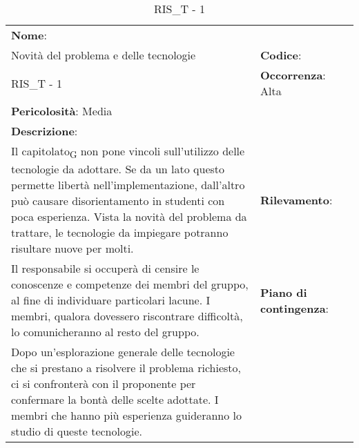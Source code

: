 \renewcommand{\arraystretch}{1.5}
\begin{longtable} { 
		>{\raggedright}p{} 
		>{\raggedright}p{} 
		>{\raggedright}p{}    }
		
		\caption{RIS\_T - 1} \endhead	


	\textbf{Nome}: \\ Novità del problema e delle tecnologie
	& \textbf{Codice}: \\ RIS\_T - 1  
	& \textbf{Occorrenza}: Alta \\ \textbf{Pericolosità}: Media
	
	\tabularnewline
	
	\textbf{Descrizione}: \\ Il \gls{capitolato}\textsubscript{G} non pone vincoli sull'utilizzo delle tecnologie da adottare. Se da un lato questo permette libertà nell'implementazione, dall'altro può causare disorientamento in studenti con poca esperienza. Vista la novità del problema da trattare, le tecnologie da impiegare potranno risultare nuove per molti.
	& 
	\textbf{Rilevamento}: \\ Il responsabile si occuperà di censire le conoscenze e competenze dei membri del gruppo, al fine di individuare particolari lacune. I membri, qualora dovessero riscontrare difficoltà, lo comunicheranno al resto del gruppo. 	
	&  
	\textbf{Piano di contingenza}: \\ Dopo un'esplorazione generale delle tecnologie che si prestano a risolvere il problema richiesto, ci si confronterà con il proponente per confermare la bontà delle scelte adottate. I membri che hanno più esperienza guideranno lo studio di queste tecnologie.

\end{longtable}

\newpage



